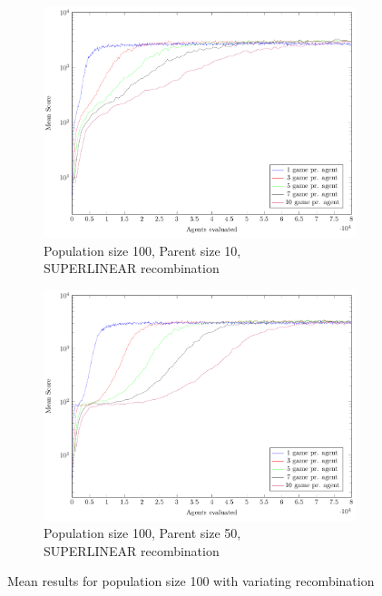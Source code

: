 \begin{figure}
\begin{subfigure}[b]{0.49\textwidth}
    \end{subfigure}
    \begin{subfigure}[b]{0.49\textwidth}
    	\centering
    	\caption{Population size 100, Parent size 10,\\SUPERLINEAR recombination}
        \includegraphics[width=\textwidth]{data/cma_population_offspring/100x_split/superlinear_l100_o10/mean/PlotFile.pdf}
    \end{subfigure}
    \begin{subfigure}[b]{0.49\textwidth}
    	\centering
    	\caption{Population size 100, Parent size 50,\\SUPERLINEAR recombination}
        \includegraphics[width=\textwidth]{data/cma_population_offspring/100x_split/superlinear_l100_o50/mean/PlotFile.pdf}
    \end{subfigure}
    
    \caption{Mean results for population size 100 with variating recombination}
\end{figure}


